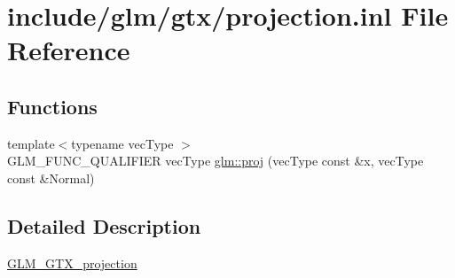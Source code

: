 \hypertarget{projection_8inl}{}\section{include/glm/gtx/projection.inl File Reference}
\label{projection_8inl}
\subsection*{Functions}
\begin{DoxyCompactItemize}
\item 
{\footnotesize template$<$typename vec\+Type $>$ }\\G\+L\+M\+\_\+\+F\+U\+N\+C\+\_\+\+Q\+U\+A\+L\+I\+F\+I\+ER vec\+Type \hyperlink{group__gtx__projection_gadf29123bcf748fc9d6fb0998192184cf}{glm\+::proj} (vec\+Type const \&x, vec\+Type const \&Normal)
\end{DoxyCompactItemize}


\subsection{Detailed Description}
\hyperlink{group__gtx__projection}{G\+L\+M\+\_\+\+G\+T\+X\+\_\+projection} 